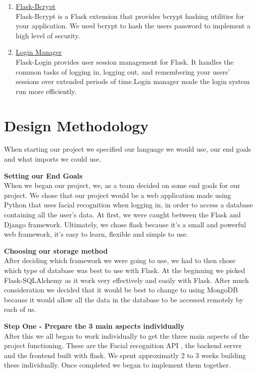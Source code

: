 \documentclass{article}
\begin{document}
\begin{enumerate}
\item \href{https://flask-bcrypt.readthedocs.io/en/latest/}{Flask-Bcrypt} \\	
Flask-Bcrypt is a Flask extension that provides bcrypt hashing utilities for your application. We used bcrypt to hash the users password to implement a high level of security.

\item \href{https://flask-login.readthedocs.io/en/latest/}{Login Manager} \\	
Flask-Login provides user session management for Flask. It handles the common tasks of logging in, logging out, and remembering your users’ sessions over extended periods of time.Login manager made the login system run more efficiently.
\end{enumerate}

\newpage

\section{Design Methodology}
When starting our project we specified our language we would use, our end goals  and what imports we could use.\medskip

\textbf{Setting our End Goals} \\
When we began our project, we, as a team decided on some end goals for our project.  We chose that our project would be a web application made using Python that uses facial recognition when logging in, in order to access a database containing all the user’s data.
At first, we were caught between the Flask and Django framework. Ultimately, we chose flask because it’s a small and powerful web framework, it’s easy to learn, flexible and simple to use.\medskip

\textbf{Choosing our storage method} \\
After deciding which framework we were going to use, we had to then chose which type of database was best to use with Flask. At the beginning we picked Flask-SQLAlchemy as it work very effectively and easily with Flask. After much consideration we decided that it would be best to change to using MongoDB because it would allow all the data in the database to be accessed remotely by each of us.\medskip

\textbf{Step One - Prepare the 3 main aspects individually} \\
After this we all began to work individually to get the three main aspects of the project functioning. These are the Facial recognition API , the backend server and the frontend built with flask. We spent approximatly 2 to 3 weeks building these individually. Once completed we began to implement them together.\medskip
\end{document}
